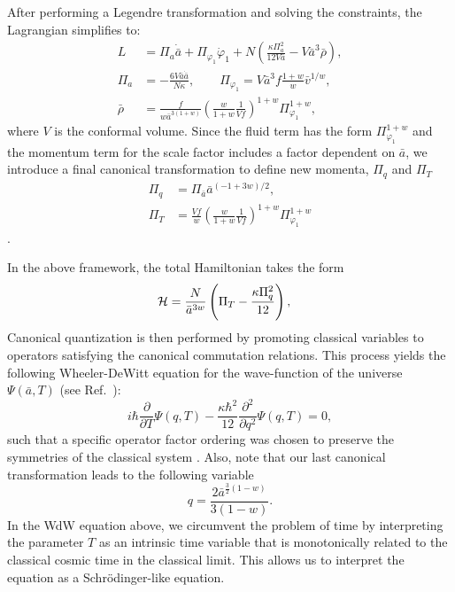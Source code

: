 \documentclass[a4paper,11pt]{article}
\newcommand{\dpar}[1]{\left(#1 \right)}
\begin{document}
{	After performing a Legendre transformation and solving the constraints, the Lagrangian
	simplifies to:
	\begin{align}
		L          & = \Pi_a \dot{\bar{a}} + \Pi_{\varphi_1} \dot{\varphi}_1 +
		N \left( \frac{\kappa \Pi_a^2}{12 V \bar{a}} - V \bar{a}^3 \bar{\rho} \right), \\
		\Pi_a      & = -\frac{6 V \bar{a} \dot{\bar{a}}}{N \kappa}, \qquad
		\Pi_{\varphi_1} = V \bar{a}^3 f \frac{1+w}{w}\bar{v}^{1/w},                    \\
		\bar{\rho} & = \frac{f}{w\bar{a}^{3(1+w)}} \left( \frac{w}{1+w}
		\frac{1}{Vf} \right)^{1+w}\Pi_{\varphi_1}^{1+w},
	\end{align}
	where $V$ is the conformal volume. Since the fluid term has the form
	$\Pi_{\varphi_1}^{1+w}$ and the momentum term for the scale factor includes a factor
	dependent on $\bar{a}$, we introduce a final canonical transformation to define new
	momenta, $\Pi_q$ and $\Pi_T$
	\begin{align}
		\Pi_q & = \Pi_{\bar{a}} \bar{a}^{(-1+3w)/2},                                                 \\
		\Pi_T & = \frac{V f}{w} \left( \frac{w}{1+w} \frac{1}{Vf}\right)^{1+w} \Pi_{\varphi_1}^{1+w}
	\end{align}.

	In the above framework, the total Hamiltonian takes the form
	\begin{align}
		\label{total_hamiltonian_FLRW}
		{\cal H} & = \frac{N}{\bar{a}^{3w}}\dpar{\Pi_{T}- \frac{\kappa\Pi_q^{2} }{12}} ,
	\end{align}
	Canonical quantization is then performed by promoting classical variables to operators
	satisfying the canonical commutation relations. This process yields the following
	Wheeler-DeWitt equation for the wave-function of the universe  $\Psi(\bar{a}, T)$
	(see Ref.~\cite{nelson_peter_bouncing_original}):
	\begin{equation}
		\label{wdweq}
		i\hbar\frac{\partial}{\partial T}\Psi(q,T) -
		\frac{\kappa\hbar^2}{12}\frac{\partial^{2}}{\partial q^{2}}\Psi(q,T)  = 0 ,
	\end{equation}
	such that a specific operator factor ordering was chosen to preserve the symmetries of
	the classical system \cite{halliwell1990introductory}. Also, note that our last
	canonical transformation leads to the following variable
	\begin{equation}
		q = \frac{2\bar{a}^{\frac{3}{2}\dpar{1-w} } }{ 3\dpar{1-w } }.
	\end{equation}
	In the WdW equation above, we circumvent the problem of time by interpreting the
	parameter $T$ as an intrinsic time variable that is monotonically related to the
	classical cosmic time in the classical limit. This allows us to interpret the equation
	as a Schrödinger-like equation.
}
\end{document}
